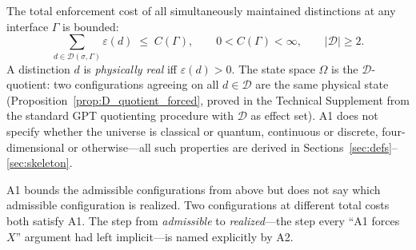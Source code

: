 \documentclass[11pt]{article}
\theoremstyle{remark}
\begin{document}
\begin{tcolorbox}[defbox, title={Axiom A1 (Finite Enforcement Capacity)}]
The total enforcement cost of all simultaneously maintained distinctions at any interface $\Gamma$ is bounded:
\[
\sum_{d \in \mathcal{D}(\sigma,\Gamma)} \varepsilon(d) \;\le\; C(\Gamma), \qquad 0 < C(\Gamma) < \infty, \qquad |\mathcal{D}| \ge 2.
\]
A distinction $d$ is \emph{physically real} iff $\varepsilon(d) > 0$.  The state space $\Omega$ is the $\mathcal{D}$-quotient: two configurations agreeing on all $d \in \mathcal{D}$ are the same physical state (Proposition~\ref{prop:D_quotient_forced}, proved in the Technical Supplement from the standard GPT quotienting procedure with $\mathcal{D}$ as effect set).  A1 does not specify whether the universe is classical or quantum, continuous or discrete, four-dimensional or otherwise---all such properties are derived in Sections~\ref{sec:defs}--\ref{sec:skeleton}.
\end{tcolorbox}

\smallskip\noindent A1 bounds the admissible configurations from above but does not say which admissible configuration is realized.  Two configurations at different total costs both satisfy A1.  The step from \emph{admissible} to \emph{realized}---the step every ``A1 forces $X$'' argument had left implicit---is named explicitly by A2.
\end{document}
